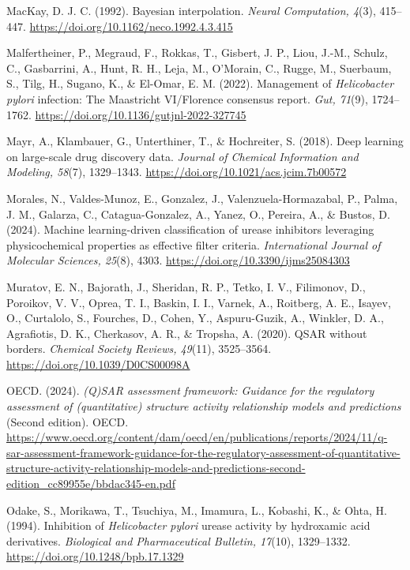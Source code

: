 \documentclass[11pt]{article}
\begin{document}
MacKay, D. J. C. (1992). Bayesian interpolation. \textit{Neural Computation, 4}(3), 415--447. \url{https://doi.org/10.1162/neco.1992.4.3.415}

Malfertheiner, P., Megraud, F., Rokkas, T., Gisbert, J. P., Liou, J.-M., Schulz, C., Gasbarrini, A., Hunt, R. H., Leja, M., O'Morain, C., Rugge, M., Suerbaum, S., Tilg, H., Sugano, K., \& El-Omar, E. M. (2022). Management of \textit{Helicobacter pylori} infection: The Maastricht VI/Florence consensus report. \textit{Gut, 71}(9), 1724--1762. \url{https://doi.org/10.1136/gutjnl-2022-327745}

Mayr, A., Klambauer, G., Unterthiner, T., \& Hochreiter, S. (2018). Deep learning on large-scale drug discovery data. \textit{Journal of Chemical Information and Modeling, 58}(7), 1329--1343. \url{https://doi.org/10.1021/acs.jcim.7b00572}

Morales, N., Valdes-Munoz, E., Gonzalez, J., Valenzuela-Hormazabal, P., Palma, J. M., Galarza, C., Catagua-Gonzalez, A., Yanez, O., Pereira, A., \& Bustos, D. (2024). Machine learning-driven classification of urease inhibitors leveraging physicochemical properties as effective filter criteria. \textit{International Journal of Molecular Sciences, 25}(8), 4303. \url{https://doi.org/10.3390/ijms25084303}

Muratov, E. N., Bajorath, J., Sheridan, R. P., Tetko, I. V., Filimonov, D., Poroikov, V. V., Oprea, T. I., Baskin, I. I., Varnek, A., Roitberg, A. E., Isayev, O., Curtalolo, S., Fourches, D., Cohen, Y., Aspuru-Guzik, A., Winkler, D. A., Agrafiotis, D. K., Cherkasov, A. R., \& Tropsha, A. (2020). QSAR without borders. \textit{Chemical Society Reviews, 49}(11), 3525--3564. \url{https://doi.org/10.1039/D0CS00098A}

OECD. (2024). \textit{(Q)SAR assessment framework: Guidance for the regulatory assessment of (quantitative) structure activity relationship models and predictions} (Second edition). OECD. \url{https://www.oecd.org/content/dam/oecd/en/publications/reports/2024/11/q-sar-assessment-framework-guidance-for-the-regulatory-assessment-of-quantitative-structure-activity-relationship-models-and-predictions-second-edition_cc89955e/bbdac345-en.pdf}

Odake, S., Morikawa, T., Tsuchiya, M., Imamura, L., Kobashi, K., \& Ohta, H. (1994). Inhibition of \textit{Helicobacter pylori} urease activity by hydroxamic acid derivatives. \textit{Biological and Pharmaceutical Bulletin, 17}(10), 1329--1332. \url{https://doi.org/10.1248/bpb.17.1329}
\end{document}
